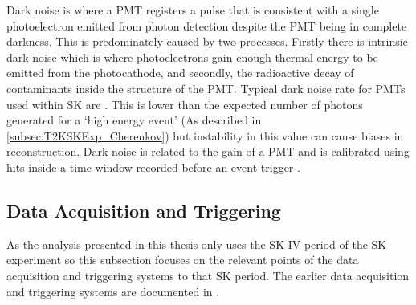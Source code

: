 
Dark noise is where a PMT registers a pulse that is consistent with a single photoelectron emitted from photon detection despite the PMT being in complete darkness. This is predominately caused by two processes. Firstly there is intrinsic dark noise which is where photoelectrons gain enough thermal energy to be emitted from the photocathode, and secondly, the radioactive decay of contaminants inside the structure of the PMT. Typical dark noise rate for PMTs used within SK are  \cite{Fukuda2003-ly}. This is lower than the expected number of photons generated for a `high energy event' (As described in \autoref{subsec:T2KSKExp_Cherenkov}) but instability in this value can cause biases in reconstruction. Dark noise is related to the gain of a PMT and is calibrated using hits inside a time window recorded before an event trigger \cite{thesis_focht}.

\subsection{Data Acquisition and Triggering}
\label{subsec:T2KSKExp_SKTriggering}

As the analysis presented in this thesis only uses the SK-IV period of the SK experiment so this subsection focuses on the relevant points of the data acquisition and triggering systems to that SK period. The earlier data acquisition and triggering systems are documented in \cite{34489,PhysRevD.73.112001}. 

